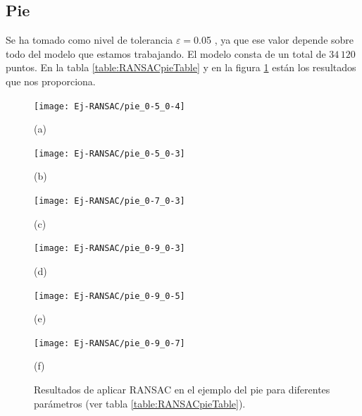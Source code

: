 \subsection{Pie}
Se ha tomado como nivel de tolerancia $ \varepsilon = $0.05 , ya que ese valor depende sobre todo del modelo que estamos trabajando. El modelo consta de un total de $ 34\,120 $ puntos. En la tabla \ref{table:RANSACpieTable} y en la figura \ref{fig:RANSACpie} están los resultados que nos proporciona. \\

\begin{figure}[h!]
	\begin{minipage}[b]{0.5\textwidth}
		\centering
		\texttt{[image: Ej-RANSAC/pie\_0-5\_0-4]} 
		\caption*{(a)}
	\end{minipage}
	\begin{minipage}[b]{0.5\textwidth}
		\centering
		\texttt{[image: Ej-RANSAC/pie\_0-5\_0-3]} 
		\caption*{(b)}
	\end{minipage}
	\begin{minipage}[b]{0.5\textwidth}
		\centering
		\texttt{[image: Ej-RANSAC/pie\_0-7\_0-3]} 
		\caption*{(c)}
	\end{minipage}
	\begin{minipage}[b]{0.5\textwidth}
		\centering
		\texttt{[image: Ej-RANSAC/pie\_0-9\_0-3]} 
		\caption*{(d)}
	\end{minipage}		
	\begin{minipage}[b]{0.5\textwidth}
		\centering
		\texttt{[image: Ej-RANSAC/pie\_0-9\_0-5]} 
		\caption*{(e)}
	\end{minipage}
	\begin{minipage}[b]{0.5\textwidth}
		\centering
		\texttt{[image: Ej-RANSAC/pie\_0-9\_0-7]} 
		\caption*{(f)}
	\end{minipage}	
	
	\caption{Resultados de aplicar RANSAC en el ejemplo del pie para diferentes parámetros (ver tabla \ref{table:RANSACpieTable}). }
	\label{fig:RANSACpie}
\end{figure}

